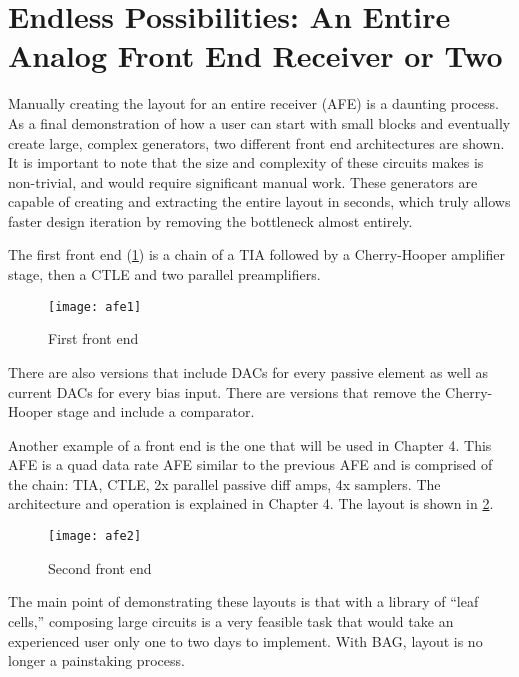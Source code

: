 \section{Endless Possibilities: An Entire Analog Front End Receiver or Two}
Manually creating the layout for an entire receiver (AFE) is a daunting process. As a final demonstration of how a user can start with small blocks and eventually create large, complex generators, two different front end architectures are shown. It is important to note that the size and complexity of these circuits makes is non-trivial, and would require significant manual work. These generators are capable of creating and extracting the entire layout in seconds, which truly allows faster design iteration by removing the bottleneck almost entirely. 

The first front end (\ref{fig:afe1}) is a chain of a TIA followed by a Cherry-Hooper amplifier stage, then a CTLE and two parallel preamplifiers. 
\begin{figure}[h]
\centering
\texttt{[image: afe1]}
\caption{First front end}
\label{fig:afe1}
\end{figure}
There are also versions that include DACs for every passive element as well as current DACs for every bias input. There are versions that remove the Cherry-Hooper stage and include a comparator. 

Another example of a front end is the one that will be used in Chapter 4. This AFE is a quad data rate AFE similar to the previous AFE and is comprised of the chain: TIA, CTLE, 2x parallel passive diff amps, 4x samplers. The architecture and operation is explained in Chapter 4. The layout is shown in \ref{fig:afe2}.
\begin{figure}[h]
\centering
\texttt{[image: afe2]}
\caption{Second front end}
\label{fig:afe2}
\end{figure}
The main point of demonstrating these layouts is that with a library of ``leaf cells,'' composing large circuits is a very feasible task that would take an experienced user only one to two days to implement. With BAG, layout is no longer a painstaking process.

